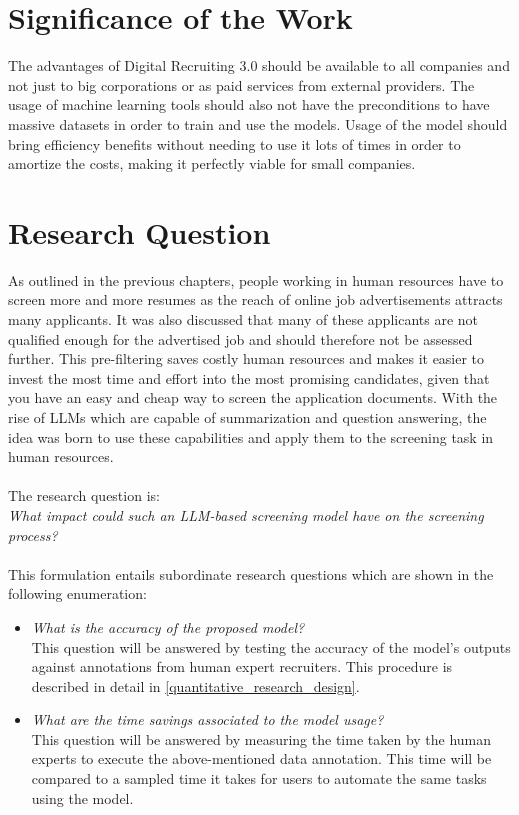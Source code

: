 \documentclass[draft,final]{thesisclass} %
\begin{document}
\section{Significance of the Work}
The advantages of Digital Recruiting 3.0 should be available to all companies and not just to big corporations or as paid services from external providers.
The usage of machine learning tools should also not have the preconditions to have massive datasets in order to train and use the models.
Usage of the model should bring efficiency benefits without needing to use it lots of times in order to amortize the costs, making it perfectly viable for small companies.

\section{Research Question}
As outlined in the previous chapters, people working in human resources have to screen more and more resumes as the reach of online job advertisements attracts many applicants.
It was also discussed that many of these applicants are not qualified enough for the advertised job and should therefore not be assessed further.
This pre-filtering saves costly human resources and makes it easier to invest the most time and effort into the most promising candidates, given that you have an easy and cheap way to screen the application documents.
With the rise of \acs{LLM}s which are capable of summarization and question answering, the idea was born to use these capabilities and apply them to the screening task in human resources.
\\\\
The research question is:\\
\textit{What impact could such an \acs{LLM}-based screening model have on the screening process?}\\\\
This formulation entails subordinate research questions which are shown in the following enumeration:
\begin{itemize}
    \item \textit{What is the accuracy of the proposed model?}\\
    This question will be answered by testing the accuracy of the model's outputs against annotations from human expert recruiters.
    This procedure is described in detail in \ref{quantitative_research_design}.
    \item \textit{What are the time savings associated to the model usage?}\\
    This question will be answered by measuring the time taken by the human experts to execute the above-mentioned data annotation.
    This time will be compared to a sampled time it takes for users to automate the same tasks using the model.
\end{itemize}
\end{document}
